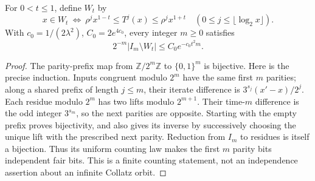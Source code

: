\begin{proposition}
\label{prop:Shaik-prefix-uniform}
For \(0<t\le1\), define \(W_t\) by
\[
 x\in W_t\ \Longleftrightarrow\
 \rho^j x^{1-t}\le T^j(x)\le\rho^j x^{1+t}
 \quad(0\le j\le\lfloor\log_2x\rfloor).
\]
With \(c_0=1/(2\lambda^2)\), \(C_0=2e^{4c_0}\), every integer
\(m\ge0\) satisfies
\begin{equation}\label{eq:Shaik-prefix-uniform}
 2^{-m}|I_m\setminus W_t|\le C_0e^{-c_0t^2m}.
\end{equation}
\end{proposition}
\begin{proof}
The parity-prefix map from \(\mathbb Z/2^m\mathbb Z\) to
\(\{0,1\}^m\) is bijective. Here is the precise induction.
Inputs congruent modulo \(2^m\) have the same first \(m\) parities;
along a shared prefix of length \(j\le m\), their iterate difference
is \(3^{s_j}(x'-x)/2^j\). Each residue modulo \(2^m\) has two lifts
modulo \(2^{m+1}\). Their time-\(m\) difference is the odd integer
\(3^{s_m}\), so the next parities are opposite. Starting with the
empty prefix proves bijectivity, and also gives its inverse by
successively choosing the unique lift with the prescribed next parity.
Reduction from \(I_m\) to residues is itself a bijection. Thus its
uniform counting law makes the first \(m\) parity bits independent fair
bits. This is a finite counting statement, not an independence
assertion about an infinite Collatz orbit.


\end{proof}
